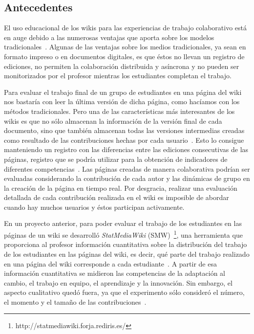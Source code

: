 	\subsection{Antecedentes} \label{subcha:antecedentes}

	El uso educacional de los wikis para las experiencias de trabajo colaborativo está en auge debido a las numerosas ventajas que aporta sobre los modelos tradicionales~\cite{elgort2008wiki}. Algunas de las ventajas sobre los medios tradicionales, ya sean en formato impreso o en documentos digitales, es que éstos no llevan un registro de ediciones, no permiten la colaboración distribuida y asíncrona y no pueden ser monitorizados por el profesor mientras los estudiantes completan el trabajo.

	Para evaluar el trabajo final de un grupo de estudiantes en una página del wiki nos bastaría con leer la última versión de dicha página, como hacíamos con los métodos tradicionales. Pero una de las características más interesantes de los wikis es que no sólo almacenan la información de la versión final de cada documento, sino que también almacenan todas las versiones intermedias creadas como resultado de las contribuciones hechas por cada usuario~\cite{trentin2009using}. Esto lo consigue manteniendo un registro con las diferencias entre las ediciones consecutivas de las páginas, registro que se podría utilizar para la obtención de indicadores de diferentes competencias~\cite{ortega2011new}. Las páginas creadas de manera colaborativa podrían ser evaluadas considerando la contribución de cada autor y las dinámicas de grupo en la creación de la página en tiempo real. Por desgracia, realizar una evaluación detallada de cada contribución realizada en el wiki es imposible de abordar cuando hay muchos usuarios y éstos participan activamente.

	En un proyecto anterior, para poder evaluar el trabajo de los estudiantes en las páginas de un wiki se desarrolló \emph{StatMediaWiki} (SMW)~\footnote{http://statmediawiki.forja.rediris.es/}, una herramienta que proporciona al profesor información cuantitativa sobre la distribución del trabajo de los estudiantes en las páginas del wiki, es decir, qué parte del trabajo realizado en una página del wiki corresponde a cada estudiante~\cite{duarte2012wikis}.  A partir de esa información cuantitativa se midieron las competencias de la adaptación al cambio, el trabajo en equipo, el aprendizaje y la innovación. Sin embargo, el aspecto cualitativo quedó fuera, ya que el experimento sólo consideró el número, el momento y el tamaño de las contribuciones~\cite{palomo2014assessment}.

